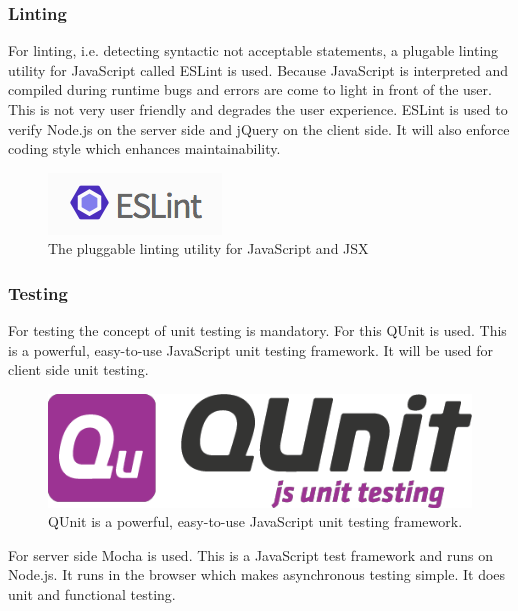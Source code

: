 \subsubsection{Linting}
For linting, i.e. detecting syntactic not acceptable statements, a plugable linting utility for JavaScript called ESLint is used. Because JavaScript is interpreted and compiled during runtime bugs and errors are come to light in front of the user. This is not very user friendly and degrades the user experience. ESLint is used to verify Node.js on the server side and jQuery on the client side. It will also enforce coding style which enhances maintainability. 

\begin{figure}[h]
  \begin{center}
    \includegraphics[scale=0.5]{./images/eslint.png}
    \caption{The pluggable linting utility for JavaScript and JSX}
    \label{fig:}
  \end{center}
\end{figure}

\subsubsection{Testing}
For testing the concept of unit testing is mandatory. For this QUnit is used. This is a powerful, easy-to-use JavaScript unit testing framework. It will be used for client side unit testing.

\begin{figure}[h]
  \begin{center}
    \includegraphics[scale=0.2]{./images/qu.png}
    \caption{QUnit is a powerful, easy-to-use JavaScript unit testing framework. }
    \label{fig:}
  \end{center}
\end{figure}

For server side Mocha is used. This is a JavaScript test framework and runs on Node.js. It runs in the browser which makes asynchronous testing simple. It does unit and functional testing.

